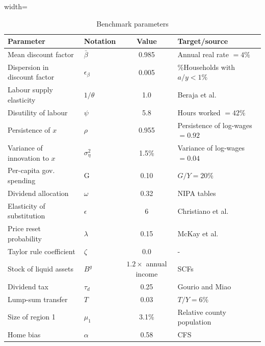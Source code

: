 \documentclass[\latexroot/\projectname]{subfiles}
\begin{document}
\begin{table}[h]
  \centering
  \caption{Benchmark parameters\whenintegrated{\label{tab:qa-benchmark-parameters}}}
  \begin{adjustbox}{width=\textwidth}
  \begin{tabular}{llcl}
    \hline
    \textbf{Parameter} & \textbf{Notation} & \textbf{Value} & \textbf{Target/source} \\
    \hline
    Mean discount factor & $\bar{\beta}$ & 0.985 & Annual real rate $=4 \%$ \\

    Dispersion in discount factor & $\epsilon_{\beta}$ & 0.005 & \%Households with $a / y<1 \%$ \\

    Labour supply elasticity & $1 / \theta$ & 1.0 & Beraja et al.~\cite{Beraja2016-km} \\

    Disutility of labour & $\psi$ & 5.8 & Hours worked $=42 \%$ \\

    Persistence of $x$ & $\rho$ & 0.955 & Persistence of log-wages $=0.92$ \\

    Variance of innovation to $x$ & $\sigma_{\eta}^{2}$ & 1.5\% & Variance of log-wages $=0.04$ \\

    Per-capita gov. spending & G & 0.10 & $G / Y=20 \%$ \\

    Dividend allocation & $\omega$ & 0.32 & NIPA tables \\

    Elasticity of substitution & $\epsilon$ & 6 & Christiano et al.~\cite{Christiano2011-ro} \\

    Price reset probability & $\lambda$ & 0.15 & McKay et al.~\cite{McKay2016-si} \\

    Taylor rule coefficient & $\zeta$ & 0.0 & - \\

    Stock of liquid assets & $B^{g}$ & $1.2 \times$ annual income & SCFs \\

    Dividend tax & $\tau_{d}$ & 0.25 & Gourio and Miao~\cite{Gourio2010-si} \\

    Lump-sum transfer & $T$ & 0.03 & $T / Y=6 \%$ \\

    Size of region 1 & $\mu_{1}$ & 3.1\% & Relative county population \\

    Home bias & $\alpha$ & 0.58 & CFS \\
    \hline
    \end{tabular}
  \end{adjustbox}
\end{table}

\smartbib
\end{document}
